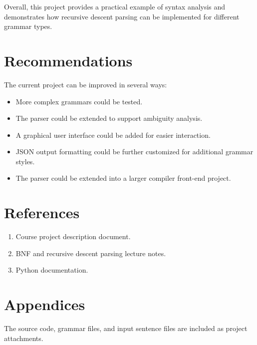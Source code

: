 \documentclass[12pt,a4paper]{article}
\begin{document}
	Overall, this project provides a practical example of syntax analysis and demonstrates how recursive descent parsing can be implemented for different grammar types.
	
	\section{Recommendations}
	The current project can be improved in several ways:
	\begin{itemize}
		\item More complex grammars could be tested.
		\item The parser could be extended to support ambiguity analysis.
		\item A graphical user interface could be added for easier interaction.
		\item JSON output formatting could be further customized for additional grammar styles.
		\item The parser could be extended into a larger compiler front-end project.
	\end{itemize}
	
	\section*{References}
	\begin{enumerate}
		\item Course project description document.
		\item BNF and recursive descent parsing lecture notes.
		\item Python documentation.
	\end{enumerate}
	
	\section*{Appendices}
	The source code, grammar files, and input sentence files are included as project attachments.
	
\end{document}
